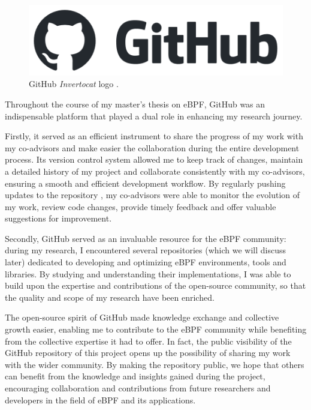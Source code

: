 \begin{figure}[h]
	\centering
	\includegraphics[width=0.7\linewidth]{images/Technologies/GitHub_logo.png}
	\caption{GitHub \textit{Invertocat} logo \cite{GitHubLogo}.}
	\label{fig:GitHub_logo}
\end{figure}

Throughout the course of my master's thesis on eBPF, GitHub was an indispensable platform that played a dual role in enhancing my research journey. 

Firstly, it served as an efficient instrument to share the progress of my work with my  co-advisors and make easier the collaboration during the entire development process. 
Its version control system allowed me to keep track of changes, maintain a detailed history of my project and collaborate consistently with my co-advisors, ensuring a smooth and efficient development workflow. 
By regularly pushing updates to the repository \cite{MasterThesisRepo}, my co-advisors were able to monitor the evolution of my work, review code changes, provide timely feedback and offer valuable suggestions for improvement.

Secondly, GitHub served as an invaluable resource for the eBPF community: during my research, I encountered several repositories (which we will discuss later) dedicated to developing and optimizing eBPF environments, tools and libraries. 
By studying and understanding their implementations, I was able to build upon the expertise and contributions of the open-source community, so that the quality and scope of my research have been enriched.

The open-source spirit of GitHub made knowledge exchange and collective growth easier, enabling me to contribute to the eBPF community while benefiting from the collective expertise it had to offer.
In fact, the public visibility of the GitHub repository of this project opens up the possibility of sharing my work with the wider community. 
By making the repository public, we hope that others can benefit from the knowledge and insights gained during the project, encouraging collaboration and contributions from future researchers and developers in the field of eBPF and its applications.
